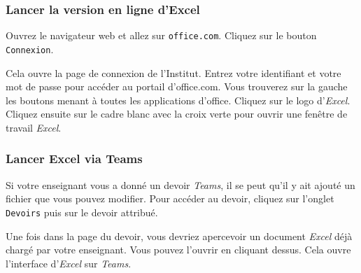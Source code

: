 
\subsubsection{Lancer la version en ligne d'Excel}

Ouvrez le navigateur web et allez sur \texttt{office.com}. Cliquez sur le bouton \texttt{Connexion}.


Cela ouvre la page de connexion de l'Institut. Entrez votre identifiant et votre mot de passe pour accéder au portail d'office.com. Vous trouverez sur la gauche les boutons menant à toutes les applications d'office. Cliquez sur le logo d'\emph{Excel}. Cliquez ensuite sur le cadre blanc avec la croix verte pour ouvrir une fenêtre de travail \emph{Excel}.


\subsubsection{Lancer Excel via Teams}

Si votre enseignant vous a donné un devoir \emph{Teams}, il se peut qu'il y ait ajouté un fichier que vous pouvez modifier. Pour accéder au devoir, cliquez sur l'onglet \texttt{Devoirs}  puis sur le devoir attribué. 


Une fois dans la page du devoir, vous devriez apercevoir un document \emph{Excel} déjà chargé par votre enseignant. Vous pouvez l'ouvrir en cliquant dessus. Cela ouvre l'interface d'\emph{Excel} sur \emph{Teams}.



%
%
%
%


